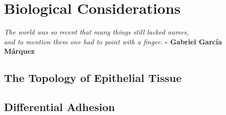 \chapter{Biological Considerations}
\begin{center}
\emph{The world was so recent that many things still lacked names,}\\
\emph{and to mention them one had to point with a finger. }
\textbf{\hspace{10ex} - Gabriel García Márquez}
\end{center}
\section{The Topology of Epithelial Tissue}
\section{Differential Adhesion}
